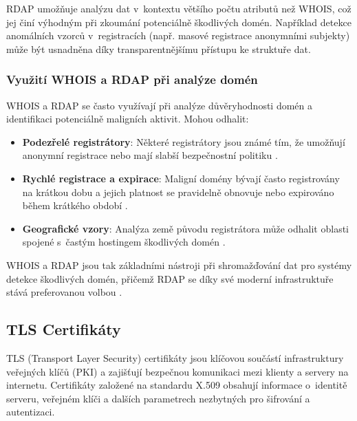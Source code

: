 RDAP umožňuje analýzu dat v~kontextu většího počtu atributů než WHOIS, což jej činí výhodným při zkoumání potenciálně škodlivých domén. Například detekce anomálních vzorců v~registracích (např. masové registrace anonymními subjekty) může být usnadněna díky transparentnějšímu přístupu ke struktuře dat.

\subsubsection*{Využití WHOIS a RDAP při analýze domén}
WHOIS a RDAP se často využívají při analýze důvěryhodnosti domén a identifikaci potenciálně maligních aktivit. Mohou odhalit:
\begin{itemize}
    \item \textbf{Podezřelé registrátory}: Některé registrátory jsou známé tím, že umožňují anonymní registrace nebo mají slabší bezpečnostní politiku \cite{shah2021rdap}.
    \item \textbf{Rychlé registrace a expirace}: Maligní domény bývají často registrovány na krátkou dobu a jejich platnost se pravidelně obnovuje nebo expirováno během krátkého období \cite{ma2009beyondblacklists}.
    \item \textbf{Geografické vzory}: Analýza země původu registrátora může odhalit oblasti spojené s~častým hostingem škodlivých domén \cite{campos2019rdap}.
\end{itemize}

WHOIS a RDAP jsou tak základními nástroji při shromažďování dat pro systémy detekce škodlivých domén, přičemž RDAP se díky své moderní infrastruktuře stává preferovanou volbou \cite{campos2019rdap}.


\subsection{TLS Certifikáty}
TLS (Transport Layer Security) certifikáty jsou klíčovou součástí infrastruktury veřejných klíčů (PKI) a zajišťují bezpečnou komunikaci mezi klienty a servery na internetu. Certifikáty založené na standardu X.509 obsahují informace o~identitě serveru, veřejném klíči a dalších parametrech nezbytných pro šifrování a autentizaci. \cite{rescorla2018tls13, cooper2008x509}

